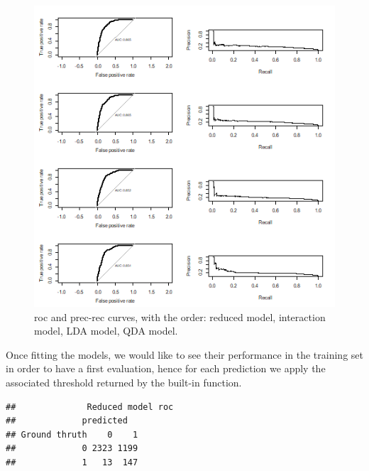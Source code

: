 \documentclass[
]{article}
\newenvironment{Shaded}{\begin{snugshade}}{\end{snugshade}}
\newcommand{\AttributeTok}[1]{\textcolor[rgb]{0.77,0.63,0.00}{#1}}
\newcommand{\DecValTok}[1]{\textcolor[rgb]{0.00,0.00,0.81}{#1}}
\newcommand{\FunctionTok}[1]{\textcolor[rgb]{0.00,0.00,0.00}{#1}}
\newcommand{\NormalTok}[1]{#1}
\newcommand{\OtherTok}[1]{\textcolor[rgb]{0.56,0.35,0.01}{#1}}
\newcommand{\SpecialCharTok}[1]{\textcolor[rgb]{0.00,0.00,0.00}{#1}}
\newcommand{\StringTok}[1]{\textcolor[rgb]{0.31,0.60,0.02}{#1}}
\begin{document}
\begin{figure}
\centering
\includegraphics{curves.png}
\caption{roc and prec-rec curves, with the order: reduced model, interaction model, LDA model, QDA model.}
\end{figure}

Once fitting the models, we would like to see their performance in the
training set in order to have a first evaluation, hence for each
prediction we apply the associated threshold returned by the built-in
function.

\begin{Shaded}
\end{Shaded}
\newpage
\begin{verbatim}
##              Reduced model roc
##             predicted
## Ground thruth    0    1
##             0 2323 1199
##             1   13  147
\end{verbatim}
\end{document}

